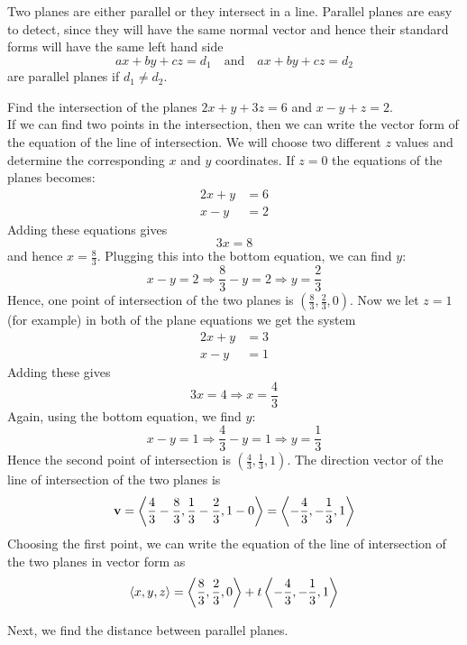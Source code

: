 \documentclass[handout]{ximera}
\begin{document}
Two planes are either parallel or they intersect in a line.
Parallel planes are easy to detect, since they will have the same normal vector and hence their standard forms
will have the same left hand side
\[
ax+by+cz = d_1 \quad \text{and} \quad ax+by+cz = d_2
\]
are parallel planes if $d_1 \neq d_2$.

\begin{example}
Find the intersection of the planes $2x + y + 3z = 6$ and $x - y + z = 2$.\\
If we can find two points in the intersection, then we can write the vector form of the equation of the line of intersection.
We will choose two different $z$ values and determine the corresponding $x$ and $y$ coordinates.
If $z = 0$ the equations of the planes becomes:
\begin{align*}
2x+y &= 6\\
x -y &= 2
\end{align*}
Adding these equations gives
\[
3x = 8
\]
and hence $x = \frac83$.  Plugging this into the bottom equation, we can find $y$:
\[
x - y = 2 \Rightarrow \frac83 -y = 2 \Rightarrow y = \frac23
\]
Hence, one point of intersection of the two planes is $\left(\frac83, \frac23, 0\right)$.
Now we let $z = 1$ (for example) in both of the plane equations we get the system
\begin{align*}
2x + y &= 3\\
x - y &= 1
\end{align*}
Adding these gives
\[
3x = 4 \Rightarrow x = \frac43
\]
Again, using the bottom equation, we find $y$:
\[
x - y = 1 \Rightarrow \frac43 - y = 1 \Rightarrow y = \frac13
\]
Hence the second point of intersection is $\left(\frac43, \frac13, 1\right)$.
The direction vector of the line of intersection of the two planes is 
\[
\mathbf{v} = \left\langle \frac43 - \frac83, \frac13 - \frac23, 1-0\right\rangle = \left\langle -\frac43, -\frac13, 1\right\rangle
\]
Choosing the first point, we can write the equation of the line of intersection of the two planes in vector form as
\[
\left\langle x, y, z\right\rangle = \left\langle \frac83, \frac23, 0\right\rangle + t \left\langle -\frac43, -\frac13, 1\right\rangle
\]

\end{example}

Next, we find the distance between parallel planes.
\end{document}
